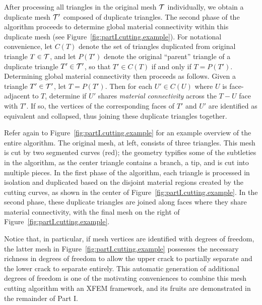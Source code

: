 After processing all triangles in the original mesh $\mathcal{T}$ individually, we obtain a duplicate mesh $\mathcal{T}'$ composed of duplicate triangles. The second phase of the algorithm proceeds to determine global material connectivity within this duplicate mesh (see Figure~\ref{fig:partI.cutting.example}). For notational convenience, let $C(T)$ denote the set of triangles duplicated from original triangle $T \in \mathcal{T}$, and let $P(T')$ denote the original ``parent'' triangle of a duplicate triangle $T' \in \mathcal{T}'$, so that $T' \in C(T)$ if and only if $T = P(T')$. Determining global material connectivity then proceeds as follows. Given a triangle $T' \in \mathcal{T}'$, let $T = P(T')$. Then for each $U' \in C(U)$ where $U$ is face-adjacent to $T$, determine if $U'$ shares \emph{material connectivity} across the $T-U$ face with $T'$. If so, the vertices of the corresponding faces of $T'$ and $U'$ are identified as equivalent and collapsed, thus joining these duplicate triangles together.

Refer again to Figure~\ref{fig:partI.cutting.example} for an example overview of the entire algorithm. The original mesh, at left, consists of three triangles. This mesh is cut by two segmented curves (red); the geometry typifies some of the subtleties in the algorithm, as the center triangle contains a branch, a tip, and is cut into multiple pieces. In the first phase of the algorithm, each triangle is processed in isolation and duplicated based on the disjoint material regions created by the cutting curves, as shown in the center of Figure~\ref{fig:partI.cutting.example}. In the second phase, these duplicate triangles are joined along faces where they share material connectivity, with the final mesh on the right of Figure~\ref{fig:partI.cutting.example}.

Notice that, in particular, if mesh vertices are identified with degrees of freedom, the latter mesh in Figure~\ref{fig:partI.cutting.example} possesses the necessary richness in degrees of freedom to allow the upper crack to partially separate and the lower crack to separate entirely. This automatic generation of additional degrees of freedom is one of the motivating conveniences to combine this mesh cutting algorithm with an XFEM framework, and its fruits are demonstrated in the remainder of Part I.

\renewcommand{\thechapter}{\arabic{chapter}}
